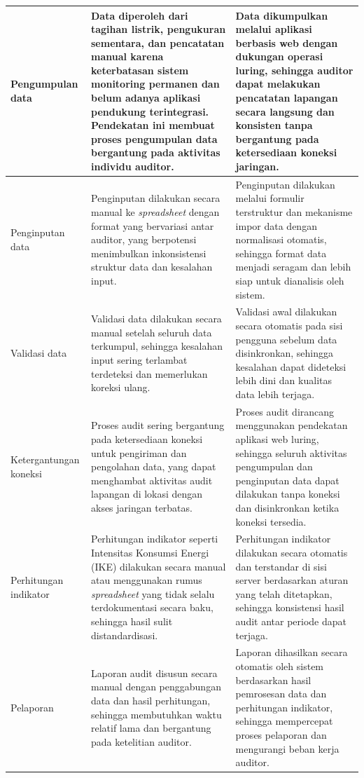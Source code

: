 \begin{tabularx}{\textwidth}{
  >{\raggedright\arraybackslash}X 
  p{5cm} 
  p{5cm}
}
  \hline
  Pengumpulan data 
  & Data diperoleh dari tagihan listrik, pengukuran sementara, dan pencatatan manual karena keterbatasan sistem monitoring permanen dan belum adanya aplikasi pendukung terintegrasi. Pendekatan ini membuat proses pengumpulan data bergantung pada aktivitas individu auditor. 
  & Data dikumpulkan melalui aplikasi berbasis web dengan dukungan operasi luring, sehingga auditor dapat melakukan pencatatan lapangan secara langsung dan konsisten tanpa bergantung pada ketersediaan koneksi jaringan. \\
  \hline
  Penginputan data 
  & Penginputan dilakukan secara manual ke \textit{spreadsheet} dengan format yang bervariasi antar auditor, yang berpotensi menimbulkan inkonsistensi struktur data dan kesalahan input. 
  & Penginputan dilakukan melalui formulir terstruktur dan mekanisme impor data dengan normalisasi otomatis, sehingga format data menjadi seragam dan lebih siap untuk dianalisis oleh sistem. \\
  \hline
  Validasi data 
  & Validasi data dilakukan secara manual setelah seluruh data terkumpul, sehingga kesalahan input sering terlambat terdeteksi dan memerlukan koreksi ulang. 
  & Validasi awal dilakukan secara otomatis pada sisi pengguna sebelum data disinkronkan, sehingga kesalahan dapat dideteksi lebih dini dan kualitas data lebih terjaga. \\
  \hline
  Ketergantungan koneksi 
  & Proses audit sering bergantung pada ketersediaan koneksi untuk pengiriman dan pengolahan data, yang dapat menghambat aktivitas audit lapangan di lokasi dengan akses jaringan terbatas. 
  & Proses audit dirancang menggunakan pendekatan aplikasi web luring, sehingga seluruh aktivitas pengumpulan dan penginputan data dapat dilakukan tanpa koneksi dan disinkronkan ketika koneksi tersedia. \\
  \hline
  Perhitungan indikator 
  & Perhitungan indikator seperti Intensitas Konsumsi Energi (IKE) dilakukan secara manual atau menggunakan rumus \textit{spreadsheet} yang tidak selalu terdokumentasi secara baku, sehingga hasil sulit distandardisasi. 
  & Perhitungan indikator dilakukan secara otomatis dan terstandar di sisi server berdasarkan aturan yang telah ditetapkan, sehingga konsistensi hasil audit antar periode dapat terjaga. \\
  \hline
  Pelaporan 
  & Laporan audit disusun secara manual dengan penggabungan data dan hasil perhitungan, sehingga membutuhkan waktu relatif lama dan bergantung pada ketelitian auditor. 
  & Laporan dihasilkan secara otomatis oleh sistem berdasarkan hasil pemrosesan data dan perhitungan indikator, sehingga mempercepat proses pelaporan dan mengurangi beban kerja auditor. \\

\end{tabularx}
